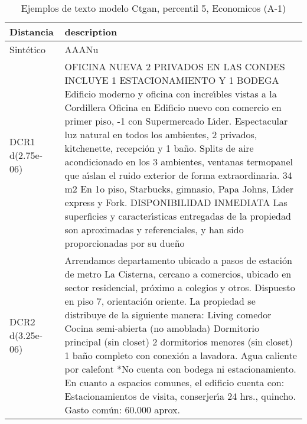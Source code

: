 \begin{table}[H]
\centering
\fontsize{10}{14}\selectfont
\caption{Ejemplos de texto modelo Ctgan, percentil 5, Economicos (A-1)}
\label{table-example-economicos-a-1-ctgan-5p-text}
\begin{tabular}{|l|m{35em}|}
\hline
\rowcolor[gray]{0.8}
Distancia & description \\
\hline Sintético & AAANu \\
\hline DCR1 d(2.75e-06) & OFICINA NUEVA 2 PRIVADOS EN LAS CONDES INCLUYE 1 ESTACIONAMIENTO Y 1 BODEGA  Edificio moderno y oficina con incre{\'\i}bles vistas a la Cordillera  Oficina en Edificio nuevo con comercio en primer piso, -1 con Supermercado L{\'\i}der. Espectacular luz natural en todos los ambientes, 2 privados, kitchenette, recepci\'on y 1 ba\~no. Splits de aire acondicionado en los 3 ambientes, ventanas termopanel que a{\'\i}slan el ruido exterior de forma extraordinaria.  34 m2  En 1o piso, Starbucks, gimnasio, Papa Johns, L{\'\i}der express y Fork.   DISPONIBILIDAD INMEDIATA   Las superficies y caracter{\'\i}sticas entregadas de la propiedad son aproximadas y referenciales, y han sido proporcionadas por su due\~no \\
\hline DCR2 d(3.25e-06) & Arrendamos departamento ubicado a pasos de estaci\'on de metro La Cisterna, cercano a comercios, ubicado en sector residencial, pr\'oximo a colegios y otros.  Dispuesto en piso 7, orientaci\'on oriente.  La propiedad se distribuye de la siguiente manera:  Living comedor Cocina semi-abierta (no amoblada) Dormitorio principal (sin closet) 2 dormitorios menores (sin closet) 1 ba\~no completo con conexi\'on a lavadora. Agua caliente por calefont  *No cuenta con bodega ni estacionamiento.  En cuanto a espacios comunes, el edificio cuenta con:  Estacionamientos de visita, conserjer{\'\i}a 24 hrs., quincho.  Gasto com\'un: 60.000 aprox. \\
\hline
\end{tabular}
\end{table}
